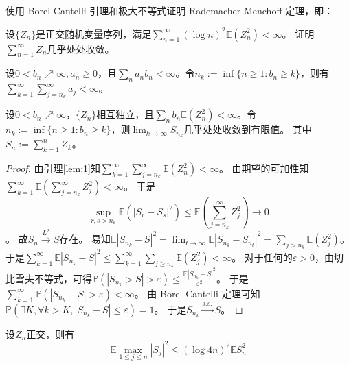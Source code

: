 \documentclass{ctexart}
\newif\ifpreface
\begin{document}
\large
\setlength{\baselineskip}{1.2em}
\ifpreface

\newgeometry{left=2cm,right=2cm,top=2cm,bottom=2cm}
\else
{}
\maketitle
\fi
\newtheorem{remark}{Remark}
\begin{problem}\label{pro:1}
  使用 Borel-Cantelli 引理和极大不等式证明 Rademacher-Menchoff 定理，即：

  设\(\{Z_n\} \)是正交随机变量序列，满足\(\sum_{n = 1}^{\infty}(\log n)^2 \mathbb{E}(Z_n^2) < \infty \)。
  证明\(\sum_{n = 1}^{\infty}Z_n \)几乎处处收敛。
\end{problem}
\begin{lemma}\label{lem:1}
  设\(0 < b_n \nearrow \infty, a_n \geq 0 \)，且\(\sum_{n}a_n b_n < \infty \)。令\(n_k := \inf \{n \geq 1:b_n \geq k\} \)，则有\(\sum_{k = 1}^{\infty}\sum_{j = n_k}^{\infty}a_j < \infty \)。
\end{lemma}
\begin{lemma}\label{lem:2}
  设\(0 < b_n \nearrow \infty\)，\(\{Z_n\} \)相互独立，且\(\sum_{n}b_n \mathbb{E}(Z_n^2)< \infty \)。令\(n_k := \inf \{n \geq 1:b_n \geq k\} \)，则\(\lim_{k \to \infty} S_{n_k} \)几乎处处收敛到有限值。
  其中\(S_n := \sum_{k=1}^{n}Z_k \)。
\end{lemma}
\begin{proof}
  由引理\ref{lem:1}知\(\sum_{k = 1}^{\infty}\sum_{j = n_k}^{\infty} \mathbb{E}(Z_n^2) < \infty \)。
  由期望的可加性知\(\sum_{k = 1}^{\infty} \mathbb{E}(\sum_{j = n_k}^{\infty} Z_j^2) < \infty \)。
  于是
  \[\sup_{r,s > n_k} \mathbb{E}(|S_r - S_s|^2) \leq \mathbb{E}(\sum_{j=n_k}^{\infty} Z_j^2) \to 0 \]。
  故\(S_n \overset{L^2}{\to} S \)存在。
  易知\(\mathbb{E} |S_{n_k}-S|^2 = \lim_{t \to \infty} \mathbb{E}|S_{n_k}-S_{n_t}|^2 = \sum_{j > n_k} \mathbb{E}(Z_j^2)\)。
  于是\(\sum_{k=1}^{\infty} \mathbb{E}|S_{n_k}-S|^2 \leq \sum_{k=1}^{\infty}\sum_{j \geq n_k}\mathbb{E}(Z_j^2) < \infty\)。
  对于任何的\(\varepsilon>0 \)，由切比雪夫不等式，可得\(\mathbb{P}(|S_{n_k}>S|>\varepsilon) \leq \frac{\mathbb{E}|S_{n_k}-S|^2}{\varepsilon^2} \)。
  于是\(\sum_{k=1}^{\infty} \mathbb{P}(|S_{n_k}-S|>\varepsilon) < \infty \)。
  由 Borel-Cantelli 定理可知\(\mathbb{P}(\exists K,\forall k > K,|S_{n_k}-S|\leq \varepsilon)=1 \)。
  于是\(S_{n_k} \overset{\mathrm{a.s.}}{\to} S \)。
\end{proof}
\begin{lemma}\label{lem:3}
  设\(Z_n \)正交，则有
  \[
    \mathbb{E} \max_{1 \leq j \leq n} |S_j|^2 \leq (\log 4n)^2 \mathbb{E} S_n^2
  \]
\end{lemma}
\end{document}
